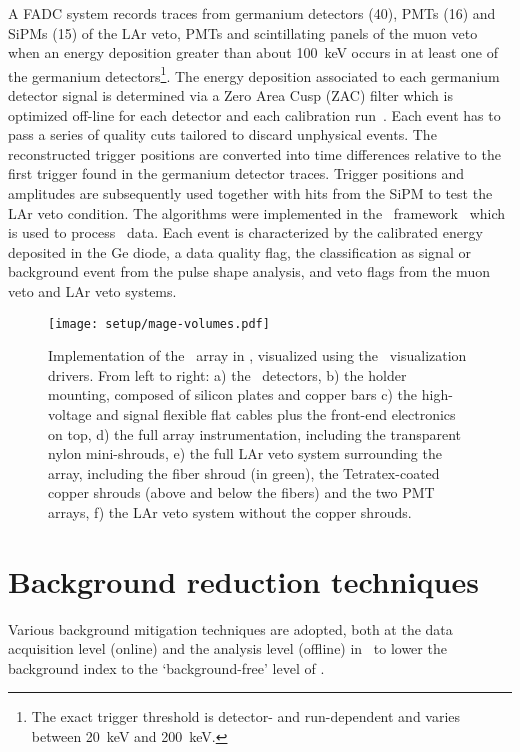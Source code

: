 A FADC system records traces from germanium detectors (40), PMTs (16) and SiPMs (15) of
the LAr veto, PMTs and scintillating panels of the muon veto when an energy deposition
greater than about 100~keV occurs in at least one of the germanium detectors\footnote{The
exact trigger threshold is detector- and run-dependent and varies between 20~keV and
200~keV.}.  The energy deposition associated to each germanium detector signal is
determined via a Zero Area Cusp (ZAC) filter which is optimized off-line for each detector
and each calibration run~\cite{Agostini2015}.  Each event has to pass a series of quality
cuts tailored to discard unphysical events. The reconstructed trigger positions are converted into time
differences relative to the first trigger found in the germanium detector traces. Trigger
positions and amplitudes are subsequently used together with hits from the SiPM to test
the LAr veto condition.  The algorithms were implemented in the \gelatio\
framework~\cite{Agostini2011} which is used to process \gerda\ data. Each event is
characterized by the calibrated energy deposited in the Ge diode, a data quality flag, the
classification as signal or background event from the pulse shape analysis, and veto flags
from the muon veto and LAr veto systems.

\begin{figure}
  \centering
  \texttt{[image: setup/mage-volumes.pdf]}
  \caption{%
    Implementation of the \gerda\ array in \mage, visualized using the
    \geant\ visualization drivers. From left to right: a) the \gerda\
    detectors, b) the holder mounting, composed of silicon plates and
    copper bars c) the high-voltage and signal flexible flat cables plus
    the front-end electronics on top, d) the full array instrumentation,
    including the transparent nylon mini-shrouds, e) the full LAr veto
    system surrounding the array, including the fiber shroud (in green),
    the Tetratex\reg-coated copper shrouds (above and below the fibers) and
    the two PMT arrays, f) the LAr veto system without the copper
    shrouds.%
  }\label{fig:setup:magevolumes}
\end{figure}

\section{Background reduction techniques}%
\label{sec:gerda:cuts}

Various background mitigation techniques are adopted, both at the data acquisition level
(online) and the analysis level (offline) in \gerda\ to lower the background index to the
`background-free' level of \pIIbi.

